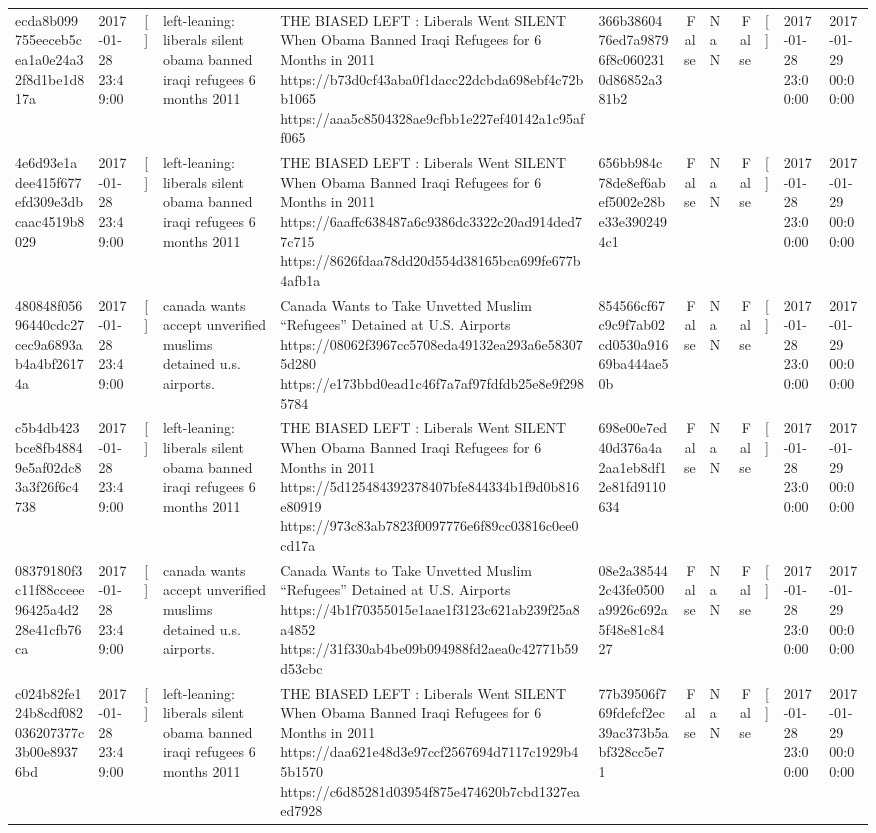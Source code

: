 \begin{tabular}{llllllrlrlll}
ecda8b099755eeceb5cea1a0e24a32f8d1be1d817a & 2017-01-28 23:49:00 & [] & left-leaning: liberals silent obama banned iraqi refugees 6 months 2011 & THE BIASED LEFT : Liberals Went SILENT When Obama Banned Iraqi Refugees for 6 Months in 2011 https://b73d0cf43aba0f1dacc22dcbda698ebf4c72bb1065 https://aaa5c8504328ae9cfbb1e227ef40142a1c95aff065 & 366b3860476ed7a98796f8c0602310d86852a381b2 & False & NaN & False & [] & 2017-01-28 23:00:00 & 2017-01-29 00:00:00 \\
4e6d93e1adee415f677efd309e3dbcaac4519b8029 & 2017-01-28 23:49:00 & [] & left-leaning: liberals silent obama banned iraqi refugees 6 months 2011 & THE BIASED LEFT : Liberals Went SILENT When Obama Banned Iraqi Refugees for 6 Months in 2011 https://6aaffc638487a6c9386dc3322c20ad914ded77c715 https://8626fdaa78dd20d554d38165bca699fe677b4afb1a & 656bb984c78de8ef6abef5002e28be33e3902494c1 & False & NaN & False & [] & 2017-01-28 23:00:00 & 2017-01-29 00:00:00 \\
480848f05696440cdc27cec9a6893ab4a4bf26174a & 2017-01-28 23:49:00 & [] & canada wants accept unverified muslims detained u.s. airports. & Canada Wants to Take Unvetted Muslim “Refugees” Detained at U.S. Airports https://08062f3967cc5708eda49132ea293a6e583075d280 https://e173bbd0ead1c46f7a7af97fdfdb25e8e9f2985784 & 854566cf67c9c9f7ab02cd0530a91669ba444ae50b & False & NaN & False & [] & 2017-01-28 23:00:00 & 2017-01-29 00:00:00 \\
c5b4db423bce8fb48849e5af02dc83a3f26f6c4738 & 2017-01-28 23:49:00 & [] & left-leaning: liberals silent obama banned iraqi refugees 6 months 2011 & THE BIASED LEFT : Liberals Went SILENT When Obama Banned Iraqi Refugees for 6 Months in 2011 https://5d125484392378407bfe844334b1f9d0b816e80919 https://973c83ab7823f0097776e6f89cc03816c0ee0cd17a & 698e00e7ed40d376a4a2aa1eb8df12e81fd9110634 & False & NaN & False & [] & 2017-01-28 23:00:00 & 2017-01-29 00:00:00 \\
08379180f3c11f88cceee96425a4d228e41cfb76ca & 2017-01-28 23:49:00 & [] & canada wants accept unverified muslims detained u.s. airports. & Canada Wants to Take Unvetted Muslim “Refugees” Detained at U.S. Airports https://4b1f70355015e1aae1f3123c621ab239f25a8a4852 https://31f330ab4be09b094988fd2aea0c42771b59d53cbc & 08e2a385442c43fe0500a9926c692a5f48e81c8427 & False & NaN & False & [] & 2017-01-28 23:00:00 & 2017-01-29 00:00:00 \\
c024b82fe124b8cdf082036207377c3b00e89376bd & 2017-01-28 23:49:00 & [] & left-leaning: liberals silent obama banned iraqi refugees 6 months 2011 & THE BIASED LEFT : Liberals Went SILENT When Obama Banned Iraqi Refugees for 6 Months in 2011 https://daa621e48d3e97ccf2567694d7117c1929b45b1570 https://c6d85281d03954f875e474620b7cbd1327eaed7928 & 77b39506f769fdefcf2ec39ac373b5abf328cc5e71 & False & NaN & False & [] & 2017-01-28 23:00:00 & 2017-01-29 00:00:00 \\

\end{tabular}
